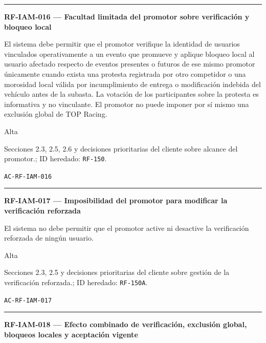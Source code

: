 \documentclass[10pt,letterpaper]{article}
\begin{document}
\vspace{0.25em}\hrule\vspace{0.65em}
\noindent\textbf{RF-IAM-016 --- Facultad limitada del promotor sobre verificación y bloqueo local}\par
\begin{description}[style=nextline,leftmargin=3.15cm,labelwidth=2.8cm,font=\normalfont\bfseries]
\item[Obligación] El sistema debe permitir que el promotor verifique la identidad de usuarios vinculados operativamente a un evento que promueve y aplique bloqueo local al usuario afectado respecto de eventos presentes o futuros de ese mismo promotor únicamente cuando exista una protesta registrada por otro competidor o una morosidad local válida por incumplimiento de entrega o modificación indebida del vehículo antes de la subasta. La votación de los participantes sobre la protesta es informativa y no vinculante. El promotor no puede imponer por sí mismo una exclusión global de TOP Racing.
\item[Prioridad] Alta
\item[Procedencia] Secciones 2.3, 2.5, 2.6 y decisiones prioritarias del cliente sobre alcance del promotor.; ID heredado: \texttt{RF-150}.
\item[Verificación] \texttt{AC-RF-IAM-016}
\end{description}
\vspace{0.25em}\hrule\vspace{0.65em}
\noindent\textbf{RF-IAM-017 --- Imposibilidad del promotor para modificar la verificación reforzada}\par
\begin{description}[style=nextline,leftmargin=3.15cm,labelwidth=2.8cm,font=\normalfont\bfseries]
\item[Obligación] El sistema no debe permitir que el promotor active ni desactive la verificación reforzada de ningún usuario.
\item[Prioridad] Alta
\item[Procedencia] Secciones 2.3, 2.5 y decisiones prioritarias del cliente sobre gestión de la verificación reforzada.; ID heredado: \texttt{RF-150A}.
\item[Verificación] \texttt{AC-RF-IAM-017}
\end{description}
\vspace{0.25em}\hrule\vspace{0.65em}
\noindent\textbf{RF-IAM-018 --- Efecto combinado de verificación, exclusión global, bloqueos locales y aceptación vigente}\par
\end{document}

